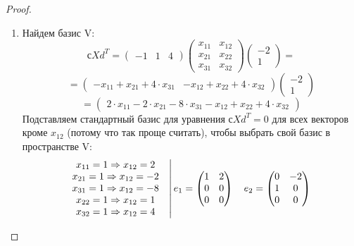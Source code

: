 \documentclass[11pt, fleqn]{article}
\begin{document}
\begin{proof}
  \begin{enumerate}
    \item Найдем базис V:
    \[с X d^T = \begin{pmatrix}
          -1 & 1 & 4
      \end{pmatrix} \begin{pmatrix}
        x_{11} & x_{12}\\
        x_{21} & x_{22}\\
        x_{31} & x_{32}
      \end{pmatrix} \begin{pmatrix}
        -2\\
        1
      \end{pmatrix} =\]
      \[= \begin{pmatrix}
        -x_{11} + x_{21} + 4 \cdot x_{31} & -x_{12} + x_{22} + 4 \cdot x_{32}
      \end{pmatrix} \begin{pmatrix}
        -2\\
        1
      \end{pmatrix}\]
      \[= \begin{pmatrix}
        2 \cdot x_{11} - 2 \cdot x_{21} - 8 \cdot x_{31} - x_{12} + x_{22} + 4 \cdot x_{32}
      \end{pmatrix}\]
      Подставляем стандартный базис для уравнения $с X d^T = 0$ для всех векторов кроме $x_{12}$ (потому что так проще считать), чтобы выбрать свой базис в пространстве V:
      \[
      \left.
      \begin{matrix}
        x_{11} = 1 \Rightarrow x_{12} = 2\\
        x_{21} = 1 \Rightarrow x_{12} = -2\\
        x_{31} = 1 \Rightarrow x_{12} = -8\\
        x_{22} = 1 \Rightarrow x_{12} = 1\\
        x_{32} = 1 \Rightarrow x_{12} = 4
      \end{matrix} \quad \right|
      \begin{matrix}
        e_1 =
        \begin{pmatrix}
          1 & 2\\
          0 & 0\\
          0 & 0
        \end{pmatrix} \quad
        e_2 =
        \begin{pmatrix}
          0 & -2\\
          1 & 0\\
          0 & 0

\end{pmatrix}
\end{matrix}\]
\end{enumerate}
\end{proof}
\end{document}
